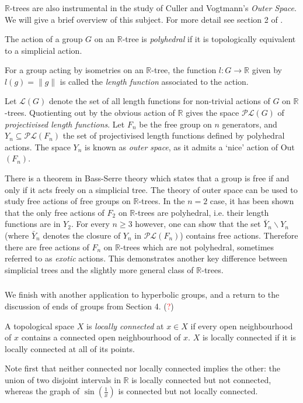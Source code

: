 \subsubsection{}
$\mathbb{R}$-trees are also instrumental in the study of Culler and Vogtmann's \textit{Outer Space}. We will give a brief overview of this subject. For more detail see section 2 of \cite{Shalen}.

\begin{definition}
    The action of a group $G$ on an $\mathbb{R}$-tree is \emph{polyhedral} if it is topologically equivalent to a simplicial action.
\end{definition}
\begin{definition}
    For a group acting by isometries on an $\mathbb{R}$-tree, the function $l:G\rightarrow\mathbb{R}$ given by $l(g)=\lVert g\rVert$ is called the \emph{length function} associated to the action.
\end{definition}

Let $\mathcal{L}(G)$ denote the set of all length functions for non-trivial actions of $G$ on $\mathbb{R}$-trees. Quotienting out by the obvious action of $\mathbb{R}$ gives the space $\mathcal{PL}(G)$ of \textit{projectivised length functions}. Let $F_n$ be the free group on $n$ generators, and $Y_n\subseteq \mathcal{PL}(F_n)$ the set of projectivised length functions defined by polyhedral actions. The space $Y_n$ is known as \textit{outer space}, as it admits a `nice' action of Out$(F_n)$. 

There is a theorem in Bass-Serre theory which states that a group is free if and only if it acts freely on a simplicial tree. The theory of outer space can be used to study free actions of free groups on $\mathbb{R}$-trees. In the $n=2$ case, it has been shown that the only free actions of $F_2$ on $\mathbb{R}$-trees are polyhedral, i.e. their length functions are in $Y_2$. For every $n\geq 3$ however, one can show that the set $\bar{Y}_n\backslash Y_n$ (where $\bar{Y}_n$ denotes the closure of $Y_n$ in $\mathcal{PL}(F_n)$) contains free actions. Therefore there are free actions of $F_n$ on $\mathbb{R}$-trees which are not polyhedral, sometimes referred to as \textit{exotic} actions. This demonstrates another key difference between simplicial trees and the slightly more general class of $\mathbb{R}$-trees.

\subsubsection{}
We finish with another application to hyperbolic groups, and a return to the discussion of ends of groups from Section 4. (\textcolor{red}{?})
\begin{definition}
    A topological space $X$ is \emph{locally connected} at $x\in X$ if every open neighbourhood of $x$ contains a connected open neighbourhood of $x$. $X$ is locally connected if it is locally connected at all of its points.
\end{definition}
Note first that neither connected nor locally connected implies the other: the union of two disjoint intervals in $\mathbb{R}$ is locally connected but not connected, whereas the graph of $\sin(\frac{1}{x})$ is connected but not locally connected.

